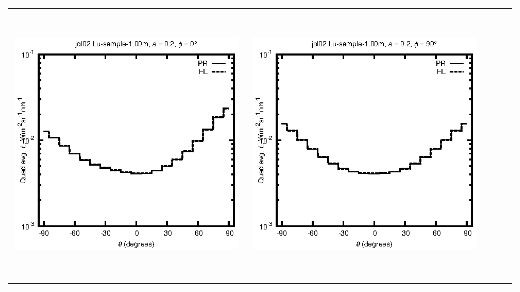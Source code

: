 \begin{tabular}{c c c c}
\includegraphics[height=7cm]{../eps/jol02_Lu_sample_1.00m_fwd.eps} &
\includegraphics[height=7cm]{../eps/jol02_Lu_sample_1.00m_cross.eps} \\
\end{tabular}

\pagebreak

